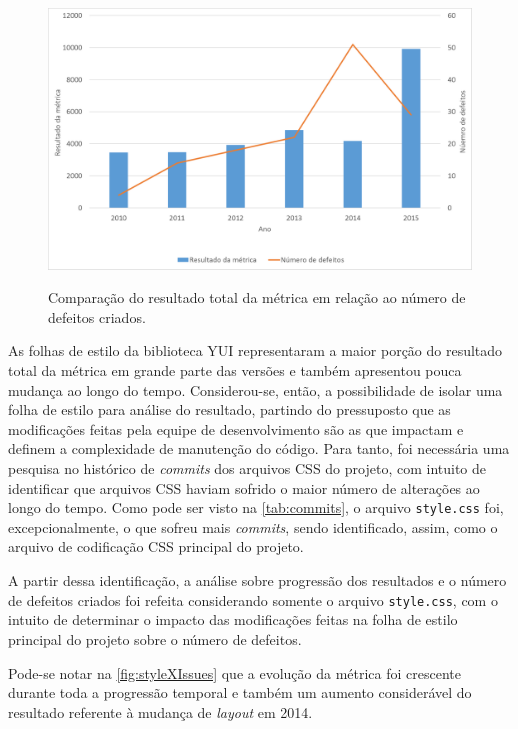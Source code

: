 \begin{figure}[!htbp]
	\centering
	\caption{Comparação do resultado total da métrica em relação ao número de defeitos criados.}
	\includegraphics[width=1\textwidth]{./04-figuras/total_issues}
	\label{fig:totalXIssue}
\end{figure}

As folhas de estilo da biblioteca YUI representaram a maior porção do resultado total da métrica em grande parte das versões e também apresentou pouca mudança ao longo do tempo. Considerou-se, então, a possibilidade de isolar uma folha de estilo para análise do resultado, partindo do pressuposto que as modificações feitas pela equipe de desenvolvimento são as que impactam e definem a complexidade de manutenção do código. Para tanto, foi necessária uma pesquisa no histórico de \textit{commits} dos arquivos CSS do projeto, com intuito de identificar que arquivos CSS haviam sofrido o maior número de alterações ao longo do tempo. Como pode ser visto na \autoref{tab:commits}, o arquivo \texttt{style.css} foi, excepcionalmente, o que sofreu mais \textit{commits}, sendo identificado, assim, como o arquivo de codificação CSS principal do projeto.



A partir dessa identificação, a análise sobre progressão dos resultados e o número de defeitos criados foi refeita considerando somente o arquivo \texttt{style.css}, com o intuito de determinar o impacto das modificações feitas na folha de estilo principal do projeto sobre o número de defeitos.

Pode-se notar na \autoref{fig:styleXIssues} que a evolução da métrica foi crescente durante toda a progressão temporal e também um aumento considerável do resultado referente à mudança de \textit{layout} em 2014.

